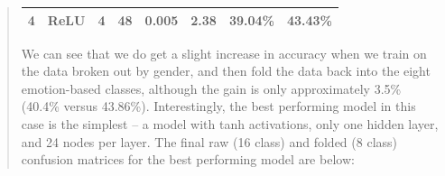 \documentclass{article}
\begin{document}
\begin{quote}
\begin{table}[h]
\begin{tabular}{|c|c|c|c|c|c|c|c|}
		4                                                                   & ReLU                                                          & 4                                                       & 48                                                          & 0.005                                                   & 2.38                                                 & 39.04\%                                                               & 43.43\%                                                                 \\ \hline
	\end{tabular}
\end{table}
	
	We can see that we do get a slight increase in accuracy when we train on the data broken out by gender, and then fold the data back into the eight emotion-based classes, although the gain is only approximately 3.5\% (40.4\% versus 43.86\%). Interestingly, the best performing model in this case is the simplest -- a model with tanh activations, only one hidden layer, and 24 nodes per layer. The final raw (16 class) and folded (8 class) confusion matrices for the best performing model are below:
	

\end{quote}
\end{document}
